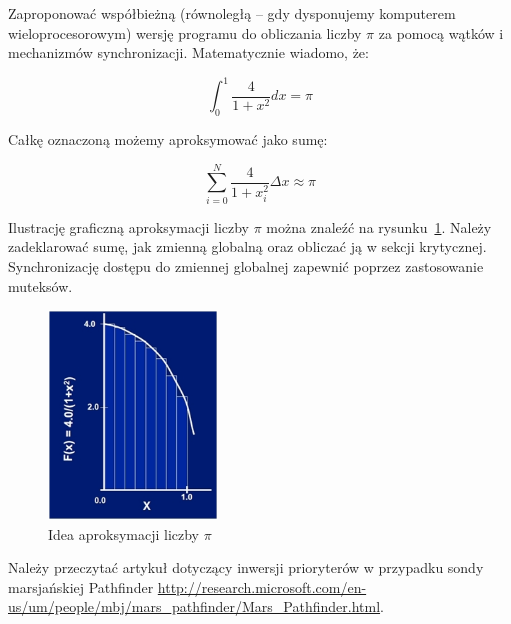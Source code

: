 \begin{myenumerate}
\item Zaproponować współbieżną (równoległą – gdy dysponujemy komputerem wieloprocesorowym) wersję programu do obliczania liczby $\pi$ za pomocą wątków i mechanizmów synchronizacji. Matematycznie wiadomo, że:

\begin{equation}\nonumber 
\displaystyle\int_0^1{\frac{4}{1+x^2}dx}=\pi
\end{equation}

Całkę oznaczoną możemy aproksymować jako sumę:

\begin{equation}\nonumber 
\sum_{i=0}^N\frac{4}{1+x_i^2}\Delta x\approx\pi
\end{equation}

Ilustrację graficzną aproksymacji liczby $\pi$ można znaleźć na rysunku~\ref{fig:piApprox}. Należy zadeklarować sumę, jak zmienną globalną oraz obliczać ją w sekcji krytycznej. Synchronizację dostępu do zmiennej globalnej zapewnić poprzez zastosowanie muteksów.

\begin{figure}[!h]
\centering
\includegraphics[width=0.4\textwidth]{img/piApprox}
\caption{Idea aproksymacji liczby $\pi$}
\label{fig:piApprox}
\end{figure}



\item Należy przeczytać artykuł dotyczący inwersji prioryterów w przypadku sondy marsjańskiej Pathfinder  \href{http://research.microsoft.com/en-us/um/people/mbj/mars\_pathfinder/Mars\_Pathfinder.html}{http://research.microsoft.com/en-us/um/people/mbj/mars\_pathfinder/Mars\_Pathfinder.html}.
\end{myenumerate}

\cleardoublepage
